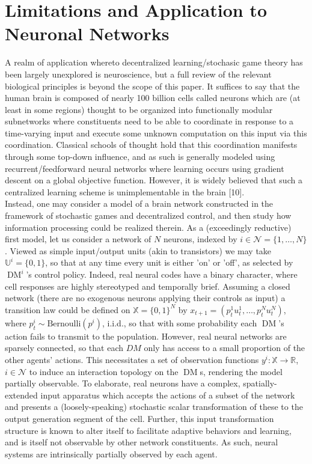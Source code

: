 \documentclass[10pt]{article}
\newcommand{\mbb}[1]{\mathbb{#1}}
\newcommand{\1}[1]{\mathbbm{1}_{#1}}
\newcommand{\mc}[1]{\mathcal{#1}}
\DeclareMathOperator{\DM}{DM}
\begin{document}
\section*{Limitations and Application to Neuronal Networks}
A realm of application whereto decentralized learning/stochasic game theory has been largely unexplored is neuroscience, but a full review of the relevant biological principles is beyond the scope of this paper. It suffices to say that the human brain is composed of nearly 100 billion cells called neurons which are (at least in some regions) thought to be organized into functionally modular subnetworks where constituents need to be able to coordinate
in response to a time-varying input and execute some unknown computation on this input via this coordination. Classical schools of thought hold that this coordination manifests through some top-down influence, and as such is generally modeled using recurrent/feedforward neural networks where learning occurs using gradient descent on a global objective function. However, it is widely believed that such a centralized learning scheme is unimplementable in the brain [10].\\[5pt]
Instead, one may consider a model of a brain network constructed in the framework of stochastic games and decentralized control, and then study how information processing could be realized therein. As a (exceedingly reductive) first model, let us consider a network of $N$ neurons, indexed by $i\in\mc{N}=\{1,\dots,N\}$. Viewed as simple input/output units (akin to transistors) we may take $\mbb{U}^i=\{0,1\}$, so that at any time every unit is either 'on' or 'off', as selected by $\DM^i$'s control policy.
Indeed, real neural codes have a binary character, where cell responses are highly stereotyped and temporally brief. 
Assuming a closed network (there are no exogenous neurons applying their controls as input) a transition law could be defined on $\mbb{X}=\{0,1\}^N$ by $x_{t+1}=(p^1_tu^1_t,\dots,p^N_tu^N_t)$, where $p^i_t\sim\text{Bernoulli}(p^i)$, i.i.d., so that with some probability each $\DM$'s action fails to transmit to the population. However, real neural networks are sparsely connected, so that each $DM$ only has access to a small proportion of the other agents' actions. This necessitates a set of observation functions $y^i:\mbb{X}\rightarrow\mbb{R}$, $i\in\mc{N}$ to induce an interaction topology on the $\DM$s,
rendering the model partially observable.
To elaborate, real neurons have a complex, spatially-extended input apparatus which accepts the actions of a subset of the network and presents a (loosely-speaking) stochastic scalar transformation of these to the output generation segment of the cell. Further, this input transformation structure is known to alter itself to facilitate adaptive behaviors and learning, and is itself not observable by other network constituents. As such, neural systems are intrinsically partially observed by each agent.\\[5pt]
\end{document}
